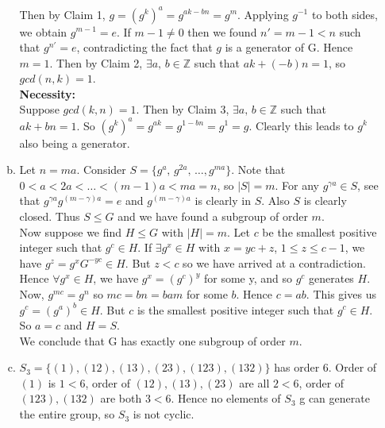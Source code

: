 \documentclass[A4paper,12pt]{article}
\theoremstyle{definition}
\numberwithin{equation}{section}
\begin{document}
\begin{enumerate}[1)]
\begin{enumerate}[(a)]
                Then by Claim 1, $g = (g^k)^a = g^{ak-bn} = g^m$.
                Applying $g^{-1}$ to both sides, we obtain $g^{m-1} = e$.
                If $m-1 \neq 0$ then we found $n' = m-1 < n$ such that $g^{n'} = e$, contradicting the fact that $g$ is a generator of G.
                Hence $m = 1$. Then by Claim 2, $\exists a,\, b \in \mathbb{Z}$ such that $ak + (-b)n = 1$, so $gcd(n, k) = 1$.
                \\
                \textbf{Necessity: }\\
                Suppose $gcd(k,n) = 1$. Then by Claim 3, $\exists a,\, b \in \mathbb{Z}$ such that $ak + bn = 1$. 
                So $(g^k)^a = g^{ak} = g^{1-bn} = g^1 = g$. Clearly this leads to $g^k$ also being a generator.
            \item
                Let $n = ma$. Consider $S = \{g^a,\, g^{2a},\, \dots, g^{ma}\}$.
                Note that $0<a<2a<\dots<(m-1)a<ma=n$, so $|S| = m$. For any $g^{\gamma a} \in S$, see that $g^{\gamma a} g^{(m-\gamma)a} = e$ and $g^{(m-\gamma)a}$ is clearly in $S$. Also $S$ is clearly closed. 
                Thus $S \le G$ and we have found a subgroup of order $m$.
                \\
                Now suppose we find $H\le G$ with $|H| = m$.
                Let $c$ be the smallest positive integer such that $g^c \in H$. 
                If $\exists g^x  \in H$ with $x = yc + z$, $1\le z \le c-1$, we have $g^z = g^xG^{-yc} \in H$. But $z<c$ so we have arrived at a contradiction.
                Hence $\forall g^x \in H$, we have $g^x = (g^c)^y$ for some y, and so $g^c$ generates $H$. 
                Now, $g^{mc} = g^n$ so $mc = bn = bam$ for some $b$.
                Hence $c = ab$. This gives us $g^c = (g^a)^b \in H$. 
                But $c$ is the smallest positive integer such that $g^c \in H$.
                So $a = c$ and $H = S$.
                \\
                We conclude that G has exactly one subgroup of order $m$.
            \item
                $S_3 = \{(1), (12), (13), (23), (123), (132)\}$ has order 6. 
                Order of $(1)$ is $1<6$, order of $(12), (13), (23)$ are all $2<6$, order of $(123), (132)$ are both $3<6$. Hence no elements of $S_3$ g can generate the entire group, so $S_3$ is not cyclic.
        \end{enumerate}




\end{enumerate}
\end{document}
